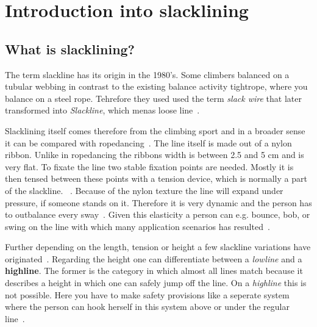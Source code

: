 \section{Introduction into slacklining}\label{3_1_introductionSlacklining}
\subsection{What is slacklining?}
The term slackline has its origin in the 1980's. Some climbers balanced on a tubular webbing in contrast to the existing balance activity tightrope, where you balance on a steel rope. Tehrefore they used used the term \textit{slack wire} that later transformed into \textit{Slackline}, which menas loose line~\cite{Zak2011-sl, Balcom2005-wl, MillerMauser2013-sl}.
\textbf{ }

Slacklining itself comes therefore from the climbing sport and in a broader sense it can be compared with ropedancing~\cite{Kleindl2011-bl}. The line itself is made out of a nylon ribbon. Unlike in ropedancing the ribbons width is between 2.5 and 5 cm and is very flat. To fixate the line two stable fixation points are needed. Mostly it is then tensed between these points with a tension device, which is normally a part of the slackline. ~\cite{Kleindl2011-bl}. Because of the nylon texture the line will expand under pressure, if someone stands on it. Therefore it is very dynamic and the person has to outbalance every sway~\cite{Kroiss2007-ab}. Given this elasticity a person can e.g. bounce, bob, or swing on the line with which many application scenarios has resulted~\cite{Balcom2005-wl}.

Further depending on the length, tension or height a few slackline variations have originated~\cite{MillerMauser2013-sl, Kleindl2011-bl, Thomann2017-ab}. Regarding the height one can differentiate between a \textit{lowline} and a \textbf{highline}. The former is the category in which almost all lines match because it describes a height in which one can safely jump off the line. On a \textit{highline} this is not possible. Here you have to make safety provisions like a seperate system where the person can hook herself in this system above or under the regular line~\cite{Kleindl2011-bl}.

